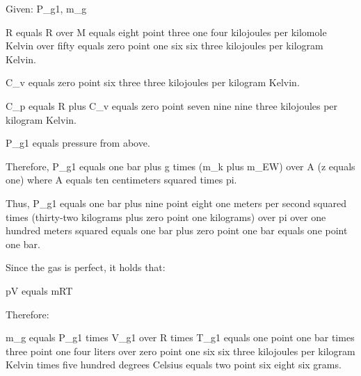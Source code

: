 Given: P_g1, m_g

R equals R over M equals eight point three one four kilojoules per kilomole Kelvin over fifty equals zero point one six six three kilojoules per kilogram Kelvin.

C_v equals zero point six three three kilojoules per kilogram Kelvin.

C_p equals R plus C_v equals zero point seven nine nine three kilojoules per kilogram Kelvin.

P_g1 equals pressure from above.

Therefore, P_g1 equals one bar plus g times (m_k plus m_EW) over A (z equals one) where A equals ten centimeters squared times pi.

Thus, P_g1 equals one bar plus nine point eight one meters per second squared times (thirty-two kilograms plus zero point one kilograms) over pi over one hundred meters squared equals one bar plus zero point one bar equals one point one bar.

Since the gas is perfect, it holds that:

pV equals mRT

Therefore:

m_g equals P_g1 times V_g1 over R times T_g1 equals one point one bar times three point one four liters over zero point one six six three kilojoules per kilogram Kelvin times five hundred degrees Celsius equals two point six eight six grams.